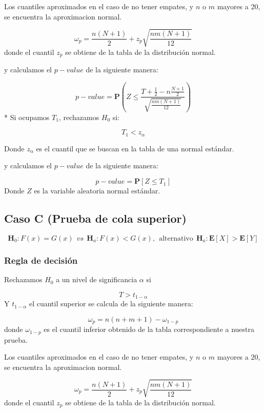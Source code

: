 \documentclass[
  a4paper,
  oneside,
  openany]{book}
\begin{document}
Los cuantiles aproximados en el caso de no tener empates, y \(n\) o \(m\) mayores a 20, se encuentra la aproximacion normal.

\[\omega_p= \frac{n(N+1)}{2} + z_p\sqrt{\frac{n m(N+1)}{12}}\]
donde el cuantil \(z_p\) se obtiene de la tabla de la distribución normal.

y calculamos el \(p-value\) de la siguiente manera:

\[p-value = \mathbf{P}\left(Z\leq\frac{T+\frac{1}{2}-n\frac{N+1}{2}}{\sqrt{\frac{nm(N+1)}{12}}}\right)\]
* Si ocupamos \(T_{1}\), rechazamos \(H_0\) si:

\[T_{1} < z_{\alpha}\]

Donde \(z_{\alpha}\) es el cuantil que se buscan en la tabla de una normal estándar.

y calculamos el \(p-value\) de la siguiente manera:

\[p-value=\mathbf{P}[Z\leq T_{1}]\]
Donde \(Z\) es la variable aleatoria normal estándar.

\hypertarget{caso-c-prueba-de-cola-superior-3}{%
\subsection*{Caso C (Prueba de cola superior)}\label{caso-c-prueba-de-cola-superior-3}}


\[\textbf{H}_0: F(x) = G(x) \ \ vs \ \ \textbf{H}_a: F(x) < G(x), \  \ \mbox{alternativo} \ \ \textbf{H}_a:\mathbf{E}[X]  > \mathbf{E}[Y]\]

\hypertarget{regla-de-decisiuxf3n-15}{%
\subsubsection*{Regla de decisión}\label{regla-de-decisiuxf3n-15}}


Rechazamos \(H_0\) a un nivel de significancia \(\alpha\) si

\[T > t_{1-{\alpha}}\]
Y \(t_{1-\alpha}\) el cuantil superior se calcula de la siguiente manera:

\[\omega_p= n(n+m+1)-\omega_{1-p}\]
donde \(\omega_{1-p}\) es el cuantil inferior obtenido de la tabla correspondiente a nuestra prueba.

Los cuantiles aproximados en el caso de no tener empates, y \(n\) o \(m\) mayores a 20, se encuentra la aproximacion normal.

\[ \omega_p= \frac{n(N+1)}{2} + z_p\sqrt{\frac{n m(N+1)}{12}}\]
donde el cuantil \(z_p\) se obtiene de la tabla de la distribución normal.
\end{document}
